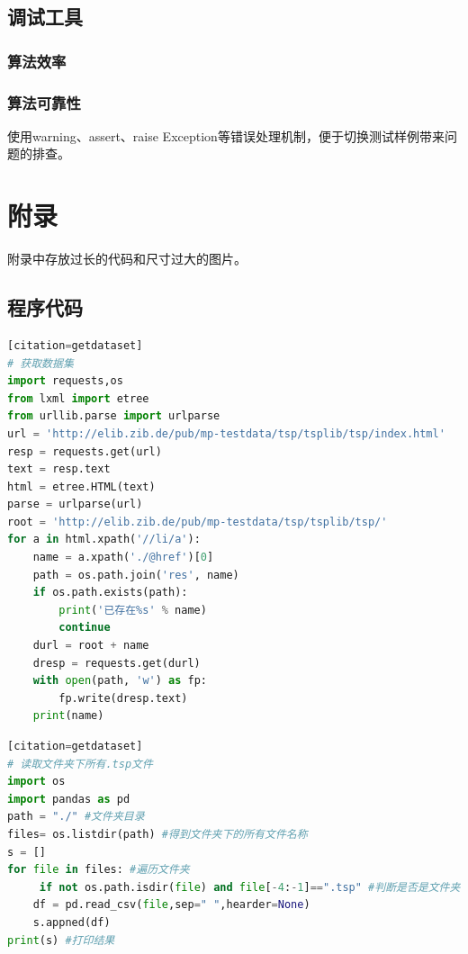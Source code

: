 \documentclass[lang=cn,11pt]{elegantpaper}
\begin{document}
\subsection{调试工具}
\subsubsection{算法效率}


\subsubsection{算法可靠性}
使用warning、assert、raise Exception等错误处理机制，便于切换测试样例带来问题的排查。










\clearpage 



\clearpage 
\appendix
\section{附录}
附录中存放过长的代码和尺寸过大的图片。
\subsection{程序代码}
\begin{lstlisting}[language=python][citation=getdataset]
# 获取数据集
import requests,os
from lxml import etree
from urllib.parse import urlparse
url = 'http://elib.zib.de/pub/mp-testdata/tsp/tsplib/tsp/index.html'
resp = requests.get(url)
text = resp.text
html = etree.HTML(text)
parse = urlparse(url)
root = 'http://elib.zib.de/pub/mp-testdata/tsp/tsplib/tsp/'
for a in html.xpath('//li/a'):
    name = a.xpath('./@href')[0]
    path = os.path.join('res', name)
    if os.path.exists(path):
        print('已存在%s' % name)
        continue
    durl = root + name
    dresp = requests.get(durl)
    with open(path, 'w') as fp:
        fp.write(dresp.text)
    print(name)
\end{lstlisting}

\begin{lstlisting}[language=python][citation=getdataset]
# 读取文件夹下所有.tsp文件
import os
import pandas as pd
path = "./" #文件夹目录
files= os.listdir(path) #得到文件夹下的所有文件名称
s = []
for file in files: #遍历文件夹
     if not os.path.isdir(file) and file[-4:-1]==".tsp" #判断是否是文件夹，不是文件夹才打开
    df = pd.read_csv(file,sep=" ",hearder=None)
    s.appned(df)
print(s) #打印结果
\end{lstlisting}
\end{document}

